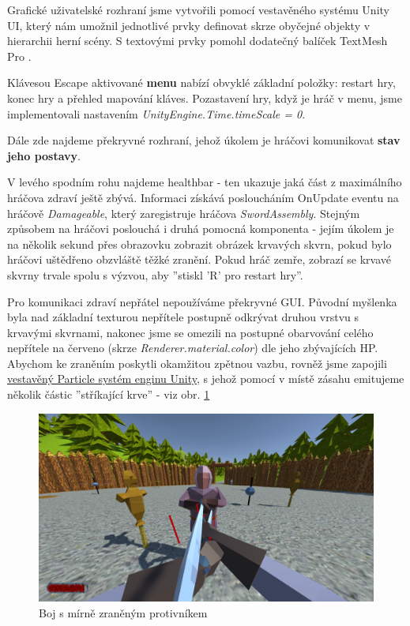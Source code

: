 Grafické uživatelské rozhraní jsme vytvořili pomocí vestavěného systému Unity UI, který nám umožnil jednotlivé prvky definovat skrze obyčejné objekty v hierarchii herní scény. S textovými prvky pomohl dodatečný balíček TextMesh Pro \cite{TextMeshPro}.
\bigbreak

Klávesou Escape aktivované \textbf{menu} nabízí obvyklé základní položky: restart hry, konec hry a přehled mapování kláves.
Pozastavení hry, když je hráč v menu, jsme implementovali nastavením \textit{UnityEngine.Time.timeScale = 0}.
\bigbreak

Dále zde najdeme překryvné rozhraní, jehož úkolem je hráčovi komunikovat \textbf{stav jeho postavy}. 

V levého spodním rohu najdeme healthbar - ten ukazuje jaká část z maximálního hráčova zdraví ještě zbývá. Informaci získává posloucháním OnUpdate eventu na hráčově \textit{Damageable}, který zaregistruje hráčova \textit{SwordAssembly}. Stejným způsobem na hráčovi poslouchá i druhá pomocná komponenta - jejím úkolem je na několik sekund přes obrazovku zobrazit obrázek krvavých skvrn, pokud bylo hráčovi uštědřeno obzvláště těžké zranění. Pokud hráč zemře, zobrazí se krvavé skvrny trvale spolu s výzvou, aby ''stiskl 'R' pro restart hry''.

Pro komunikaci zdraví nepřátel nepoužíváme překryvné GUI. Původní myšlenka byla nad základní texturou nepřítele postupně odkrývat druhou vrstvu s krvavými skvrnami, nakonec jsme se omezili na postupné obarvování celého nepřítele na červeno (skrze \textit{Renderer.material.color}) dle jeho zbývajících HP. Abychom ke zraněním poskytli okamžitou zpětnou vazbu, rovněž jsme zapojili \href{https://docs.unity3d.com/2022.2/Documentation/Manual/Built-inParticleSystem.html}{vestavěný Particle systém enginu Unity}, s jehož pomocí v místě zásahu emitujeme několik částic ''stříkající krve'' - viz obr. \ref{obr05:demogameEnemyBloodied}

\begin{figure}[!h]\centering
  \center
  \includegraphics[width=140mm]{../img/demogameFightEnemyBloodied.png}
  \caption{Boj s mírně zraněným protivníkem}
  \label{obr05:demogameEnemyBloodied}
\end{figure} 

